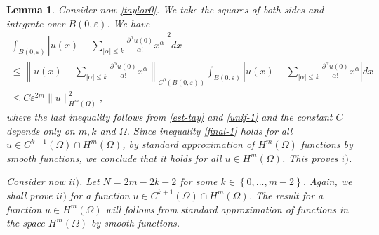 \documentclass[11pt,a4paper]{amsart}
\numberwithin{equation}{section}
\newtheorem{lemma}[equation]{Lemma}
\begin{document}
\begin{lemma}
Consider now \eqref{taylor0}. We take the squares of both sides and integrate over $B(0,\varepsilon)$. We have
\begin{multline}\label{final-1}
\int_{B(0,\varepsilon)}\left|u(x)-\sum_{|\alpha|\leq k}\frac{\partial^{\alpha}u(0)}{\alpha !} x^{\alpha}\right|^2dx\\
\leq \left\|u(x)-\sum_{|\alpha|\leq k}\frac{\partial^{\alpha}u(0)}{\alpha!}x^{\alpha}\right\|_{C^{0}(B(0,\varepsilon))} \int_{B(0,\varepsilon)}\left|u(x)-\sum_{|\alpha|\leq k}\frac{\partial^{\alpha}u(0)}{\alpha !} x^{\alpha}\right|dx\\
\leq C \varepsilon^{2m}\|u\|_{H^m(\Omega)}^2,
\end{multline}
where the last inequality follows from \eqref{est-tay} and \eqref{unif-1} and the constant $C$ depends only on $m,k$ and $\Omega$. Since inequality \eqref{final-1} holds for all $u\in C^{k+1}(\Omega)\cap H^m(\Omega)$, by standard approximation of $H^m(\Omega)$ functions by smooth functions, we conclude that it holds for all $u\in H^m(\Omega)$. This proves $i)$.

Consider now $ii)$. Let $N=2m-2k-2$ for some $k\in\left\{0,...,m-2\right\}$. Again, we shall prove $ii)$ for a function $u\in C^{k+1}(\Omega)\cap H^m(\Omega)$. The result for a function $u\in H^m(\Omega)$ will follows from standard approximation of functions in the space $H^m(\Omega)$ by smooth functions.


\end{lemma}
\end{document}
